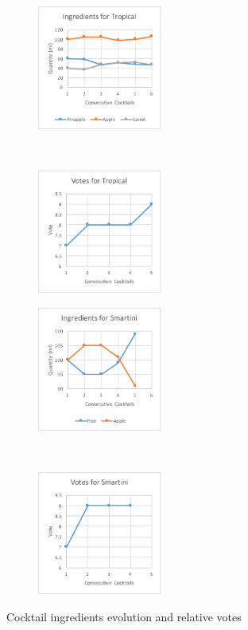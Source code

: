 \documentclass[conference]{IEEEtran}
\begin{document}
\begin{figure}[t!]
    \centering
    \begin{subfigure}[t]{0.25\textwidth}
        \centering
        \includegraphics[height=1.6in]{figures/tropicalIng}
    \end{subfigure}%
    ~ 
    \begin{subfigure}[t]{0.25\textwidth}
        \centering
        \includegraphics[height=1.6in]{figures/tropicalVotes}
    \end{subfigure}
        \begin{subfigure}[t]{0.25\textwidth}
        \centering
        \includegraphics[height=1.6in]{figures/smartiniIng}
    \end{subfigure}%
    ~ 
    \begin{subfigure}[t]{0.25\textwidth}
        \centering
        \includegraphics[height=1.6in]{figures/smartiniVotes}
    \end{subfigure}
    \caption{Cocktail ingredients evolution and relative votes}
    \label{fig:ingResults}
\end{figure}
\end{document}
